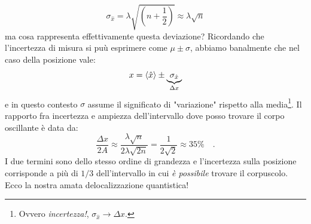 \[
    \sigma_{\hat{x}} = \lambda \sqrt{\left(n+\frac{1}{2}\right)} \approx \lambda \sqrt{n}
\] 
ma cosa rappresenta effettivamente questa deviazione? Ricordando che l'incertezza di misura si puù esprimere come $\mu \pm \sigma$, abbiamo banalmente che nel caso della posizione vale:
\[
    x = \left\langle \hat{x} \right\rangle \pm \underbrace{\sigma_{\hat{x}}}_{\Delta x}
\]
e in questo contesto $\sigma$ assume il significato di "variazione" rispetto alla media\footnote{Ovvero \emph{incertezza!}, $\sigma_{\hat{x}} \to \Delta x$.}. Il rapporto fra incertezza e ampiezza dell'intervallo dove posso trovare il corpo oscillante è data da:
\[
    \frac{\Delta x}{2A} \approx \frac{\lambda \sqrt{n}}{2\lambda \sqrt{2n}} = \frac{1}{2\sqrt{2}} \approx 35 \% \quad.
\]
I due termini sono dello stesso ordine di grandezza e l'incertezza sulla posizione corrisponde a più di $1/3$ dell'intervallo in cui \emph{è possibile} trovare il corpuscolo. Ecco la nostra amata delocalizzazione quantistica!

